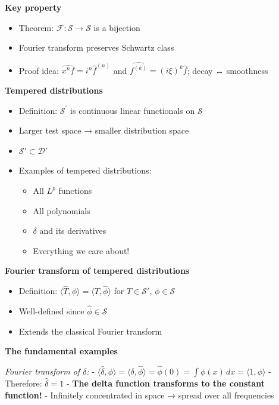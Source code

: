 \documentclass[
  10pt,
  letterpaper,
]{scrbook}
\providecommand{\tightlist}{%
  \setlength{\itemsep}{0pt}\setlength{\parskip}{0pt}}
\begin{document}
\textbf{Key property}

\begin{itemize}
\tightlist
\item
  Theorem: \(\mathcal{F}: \mathcal{S} \to \mathcal{S}\) is a bijection
\item
  Fourier transform preserves Schwartz class
\item
  Proof idea: \(\widehat{x^n f} = i^n \hat{f}^{(n)}\) and
  \(\widehat{f^{(k)}} = (i\xi)^k \hat{f}\); decay ↔ smoothness
\end{itemize}

\textbf{Tempered distributions}

\begin{itemize}
\tightlist
\item
  Definition: \(\mathcal{S}^\prime\) is continuous linear functionals on
  \(\mathcal{S}\)
\item
  Larger test space → smaller distribution space
\item
  \(\mathcal{S}' \subset \mathcal{D}'\)
\item
  Examples of tempered distributions:

  \begin{itemize}
  \tightlist
  \item
    All \(L^p\) functions
  \item
    All polynomials
  \item
    \(\delta\) and its derivatives
  \item
    Everything we care about!
  \end{itemize}
\end{itemize}

\textbf{Fourier transform of tempered distributions}

\begin{itemize}
\tightlist
\item
  Definition:
  \(\langle \hat{T}, \phi \rangle = \langle T, \hat{\phi} \rangle\) for
  \(T \in \mathcal{S}'\), \(\phi \in \mathcal{S}\)
\item
  Well-defined since \(\hat{\phi} \in \mathcal{S}\)
\item
  Extends the classical Fourier transform
\end{itemize}

\textbf{The fundamental examples}

\emph{Fourier transform of \(\delta\):} -
\(\langle \hat{\delta}, \phi \rangle = \langle \delta, \hat{\phi} \rangle = \hat{\phi}(0) = \int \phi(x)\, dx = \langle 1, \phi \rangle\)
- Therefore: \(\hat{\delta} = 1\) - \textbf{The delta function
transforms to the constant function!} - Infinitely concentrated in space
→ spread over all frequencies
\end{document}
